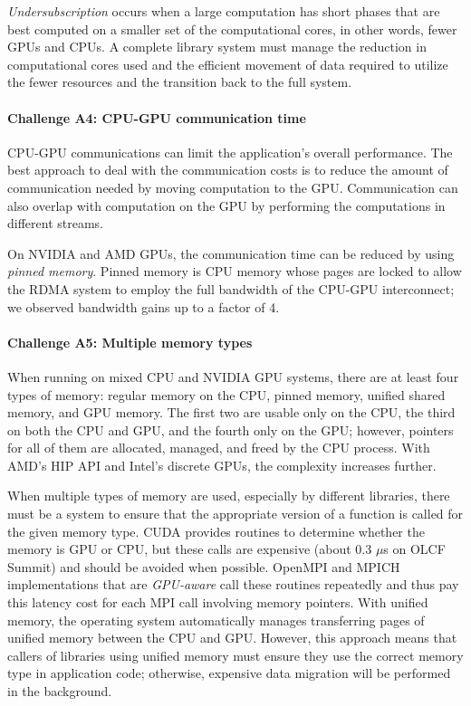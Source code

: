 \documentclass[10pt,journal,compsoc]{IEEEtran}
\begin{document}
\emph{Undersubscription} occurs when a large computation has short phases that are best computed on a smaller set of the computational cores, in other words, fewer GPUs and CPUs. A complete library system must manage the reduction in computational cores used
and the efficient movement of data required to utilize the fewer resources and the transition back to the full system.

\paragraph{Challenge A4: CPU-GPU communication time}
\label{subsec:ChallengeF2}
CPU-GPU communications can limit the application's overall performance. The best approach to deal with the communication costs is
to reduce the amount of communication needed by moving computation to the GPU. Communication can also overlap with computation on the GPU by performing the computations in different streams.

On NVIDIA and AMD GPUs, the communication time can be reduced by
using {\em pinned memory}. Pinned memory is CPU memory whose pages are
locked to allow the RDMA system to employ the full bandwidth of the CPU-GPU interconnect; we observed bandwidth gains up to a factor of 4. 


\paragraph{Challenge A5: Multiple memory types}
\label{subsec:ChallengeD1}
When running on mixed CPU and NVIDIA GPU systems, there are at least four types of memory: regular memory on the CPU,
pinned memory,
unified shared memory, and GPU memory. %
The first two are usable only on the CPU, the
third on both the CPU and GPU, and the fourth  only  on the GPU;
however, pointers for all of them are allocated, managed, and freed by the CPU
process. With AMD's HIP API and Intel's discrete GPUs, the complexity increases further.

When multiple types of memory are used, especially by different libraries, there must be a system to ensure that the appropriate
version of a function is called for the given memory type. CUDA provides routines to determine
whether the memory is GPU or CPU, but these calls
are  expensive (about 0.3 $\mu$s on OLCF Summit) and should be avoided when possible.
OpenMPI and MPICH implementations that are {\em GPU-aware} call these routines repeatedly and thus pay this latency cost for
each MPI call involving memory pointers.
With unified memory, the operating
system automatically manages transferring pages of unified memory between
the CPU and GPU. However, this approach means that
callers of libraries using unified memory must ensure they use the correct memory type in application code; otherwise, expensive data migration will be performed in the background.
\end{document}
